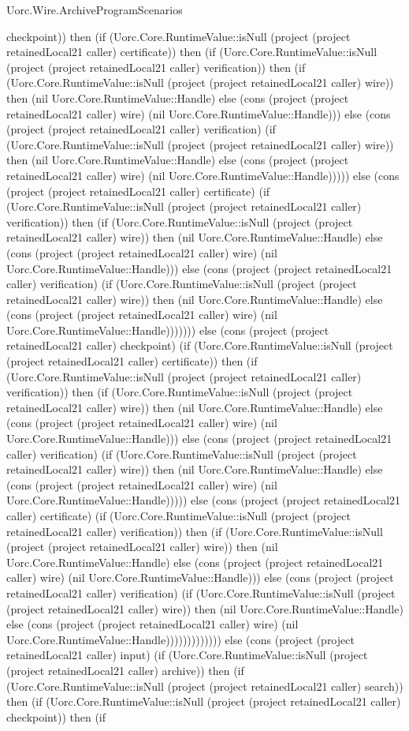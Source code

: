 \begin{lexlean}{Uorc.Wire.ArchiveProgramScenarios}
\begin{semanticmodule}
{checkpoint)) then (if (Uorc.Core.RuntimeValue::isNull (project (project retainedLocal21 caller) certificate)) then (if (Uorc.Core.RuntimeValue::isNull (project (project retainedLocal21 caller) verification)) then (if (Uorc.Core.RuntimeValue::isNull (project (project retainedLocal21 caller) wire)) then (nil Uorc.Core.RuntimeValue::Handle) else (cons (project (project retainedLocal21 caller) wire) (nil Uorc.Core.RuntimeValue::Handle))) else (cons (project (project retainedLocal21 caller) verification) (if (Uorc.Core.RuntimeValue::isNull (project (project retainedLocal21 caller) wire)) then (nil Uorc.Core.RuntimeValue::Handle) else (cons (project (project retainedLocal21 caller) wire) (nil Uorc.Core.RuntimeValue::Handle))))) else (cons (project (project retainedLocal21 caller) certificate) (if (Uorc.Core.RuntimeValue::isNull (project (project retainedLocal21 caller) verification)) then (if (Uorc.Core.RuntimeValue::isNull (project (project retainedLocal21 caller) wire)) then (nil Uorc.Core.RuntimeValue::Handle) else (cons (project (project retainedLocal21 caller) wire) (nil Uorc.Core.RuntimeValue::Handle))) else (cons (project (project retainedLocal21 caller) verification) (if (Uorc.Core.RuntimeValue::isNull (project (project retainedLocal21 caller) wire)) then (nil Uorc.Core.RuntimeValue::Handle) else (cons (project (project retainedLocal21 caller) wire) (nil Uorc.Core.RuntimeValue::Handle))))))) else (cons (project (project retainedLocal21 caller) checkpoint) (if (Uorc.Core.RuntimeValue::isNull (project (project retainedLocal21 caller) certificate)) then (if (Uorc.Core.RuntimeValue::isNull (project (project retainedLocal21 caller) verification)) then (if (Uorc.Core.RuntimeValue::isNull (project (project retainedLocal21 caller) wire)) then (nil Uorc.Core.RuntimeValue::Handle) else (cons (project (project retainedLocal21 caller) wire) (nil Uorc.Core.RuntimeValue::Handle))) else (cons (project (project retainedLocal21 caller) verification) (if (Uorc.Core.RuntimeValue::isNull (project (project retainedLocal21 caller) wire)) then (nil Uorc.Core.RuntimeValue::Handle) else (cons (project (project retainedLocal21 caller) wire) (nil Uorc.Core.RuntimeValue::Handle))))) else (cons (project (project retainedLocal21 caller) certificate) (if (Uorc.Core.RuntimeValue::isNull (project (project retainedLocal21 caller) verification)) then (if (Uorc.Core.RuntimeValue::isNull (project (project retainedLocal21 caller) wire)) then (nil Uorc.Core.RuntimeValue::Handle) else (cons (project (project retainedLocal21 caller) wire) (nil Uorc.Core.RuntimeValue::Handle))) else (cons (project (project retainedLocal21 caller) verification) (if (Uorc.Core.RuntimeValue::isNull (project (project retainedLocal21 caller) wire)) then (nil Uorc.Core.RuntimeValue::Handle) else (cons (project (project retainedLocal21 caller) wire) (nil Uorc.Core.RuntimeValue::Handle))))))))))))) else (cons (project (project retainedLocal21 caller) input) (if (Uorc.Core.RuntimeValue::isNull (project (project retainedLocal21 caller) archive)) then (if (Uorc.Core.RuntimeValue::isNull (project (project retainedLocal21 caller) search)) then (if (Uorc.Core.RuntimeValue::isNull (project (project retainedLocal21 caller) checkpoint)) then (if }
\end{semanticmodule}
\end{lexlean}
